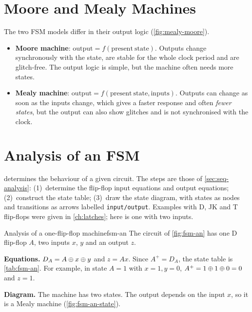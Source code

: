 
\section{Moore and Mealy Machines}\label{sec:models}
The two FSM models differ in their output logic (\cref{fig:mealy-moore}).
\begin{itemize}
  \item \textbf{Moore machine}: $\mathrm{output}=f(\mathrm{present\ state})$. Outputs change synchronously with the state, are stable for the whole clock period and are glitch-free. The output logic is simple, but the machine often needs more states.
  \item \textbf{Mealy machine}: $\mathrm{output}=f(\mathrm{present\ state},\mathrm{inputs})$. Outputs can change as soon as the inputs change, which gives a faster response and often \emph{fewer states}, but the output can also show glitches and is not synchronised with the clock.
\end{itemize}


\section{Analysis of an FSM}\label{sec:fsm-analysis}
 determines the behaviour of a given circuit. The steps are those of \cref{sec:seq-analysis}: (1)~determine the flip-flop input equations and output equations; (2)~construct the state table; (3)~draw the state diagram, with states as nodes and transitions as arrows labelled \texttt{input/output}. Examples with D, JK and T flip-flops were given in \cref{ch:latches}; here is one with two inputs.

\begin{example}{Analysis of a one-flip-flop machine}{fsm-an}
The circuit of \cref{fig:fsm-an} has one D flip-flop $A$, two inputs $x$, $y$ and an output $z$.

\textbf{Equations.} $D_A=A\oplus x\oplus y$ and $z=Ax$. Since $A^+=D_A$, the state table is \cref{tab:fsm-an}. For example, in state $A=1$ with $x=1,y=0$, $A^+=1\oplus1\oplus0=0$ and $z=1$.

\textbf{Diagram.} The machine has two states. The output depends on the input $x$, so it is a Mealy machine (\cref{fig:fsm-an-state}).
\end{example}

